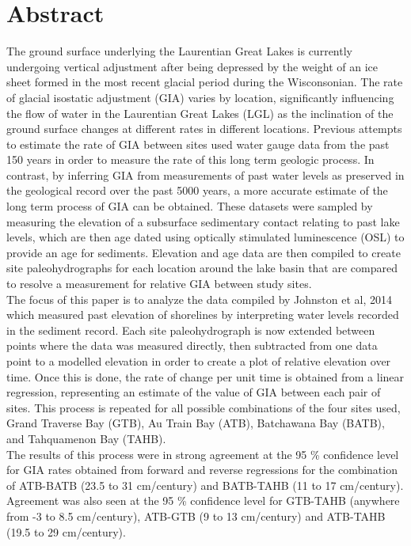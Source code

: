 


\newcommand{\result}[1]{%
    \dtlgetrowforvalue{result}{\dtlcolumnindex{result}{id}}{#1}%
}


\section{Abstract}

The ground surface underlying the Laurentian Great Lakes is currently undergoing vertical adjustment
 after being depressed by the weight of an ice sheet formed in the most recent glacial period during the Wisconsonian.
 The rate of glacial isostatic adjustment (GIA) varies by location, significantly influencing the flow of water
 in the Laurentian Great Lakes (LGL) as the inclination of the ground surface changes at different rates
 in different locations. Previous attempts to 
 estimate the rate of GIA between sites used water gauge data from the
 past 150 years in order to measure the rate of this long term geologic process. In contrast, by
 inferring GIA from measurements of past water levels as preserved in the geological record over the past 5000 years,
 a more accurate estimate of the long term process of GIA can be obtained. These
 datasets were sampled by measuring the elevation of a subsurface sedimentary contact relating to
 past lake levels, which are then age dated using optically stimulated luminescence
 (OSL) to provide an age for sediments. Elevation and age data are then compiled
 to create site paleohydrographs for each location around the lake basin that are
 compared to resolve a measurement for relative GIA between study sites.\\
 
 The focus of this paper is to analyze the data compiled by Johnston et al, 2014
 which measured past elevation of shorelines by interpreting water levels recorded
 in the sediment record. Each site paleohydrograph
 is now extended between points where the data was measured directly, then subtracted
 from one data point to a modelled elevation in order to create a
 plot of relative elevation over time. Once this is done, the rate of change per unit
 time is obtained from a linear regression, representing an estimate of the value
 of GIA between each pair of sites. This process is repeated for
 all possible combinations of the four sites used, 
 Grand Traverse Bay (GTB), Au Train Bay (ATB), Batchawana Bay (BATB), and Tahquamenon Bay (TAHB).\\
 
 
 
 The results of this process were in strong agreement at the 95 \% confidence level for GIA rates obtained from
 forward and reverse regressions for the combination of ATB-BATB (23.5 to 31 cm/century) and
 BATB-TAHB (11 to 17 cm/century). Agreement was also seen at the 95 \% confidence level for GTB-TAHB (anywhere from -3 to 8.5 cm/century),
 ATB-GTB (9 to 13 cm/century) and ATB-TAHB (19.5 to 29 cm/century).
